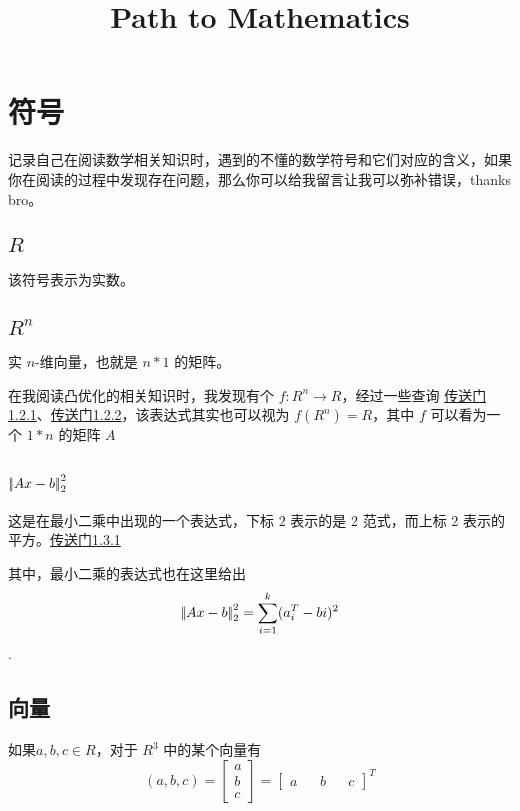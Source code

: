 \documentclass[article]{article}
\begin{document}
\title{Path to Mathematics}
\maketitle

\section{符号}
记录自己在阅读数学相关知识时，遇到的不懂的数学符号和它们对应的含义，如果你在阅读的过程中发现存在问题，那么你可以给我留言让我可以弥补错误，thanks bro。
\subsection{\texorpdfstring{$R$}{}}
该符号表示为实数。

\subsection{\texorpdfstring{$R^n$}{}}
实 $n$-维向量，也就是 $n*1$ 的矩阵。

在我阅读凸优化的相关知识时，我发现有个 $f: R^n \to R$，经过一些查询 \href{https://math.stackexchange.com/questions/1852420/what-does-mathbbrn-to-mathbbrm-mean-and-what-is-mathbbrn}{传送门1.2.1}、\href{https://math.ryerson.ca/~danziger/professor/MTH141/Handouts/vectors.pdf}{传送门1.2.2}，该表达式其实也可以视为 $f(R^n) = R$，其中 $f$ 可以看为一个 $1 * n$ 的矩阵 $A$

\subsection{\texorpdfstring{$\text{\textbardbl} Ax -b \text{\textbardbl}_2^2$}{}}
这是在最小二乘中出现的一个表达式，下标 $2$ 表示的是 2 范式，而上标 $2$ 表示的平方。\href{https://math.stackexchange.com/questions/3045899/if-a-has-orthonormal-columns-then-ax2-2-x2-2-why}{传送门1.3.1}

其中，最小二乘的表达式也在这里给出 $$\text{\textbardbl} Ax -b \text{\textbardbl}_2^2 = \displaystyle\sum_{i = 1}^k(a^T_i - bi)^2$$.

\subsection{向量}
如果$a,b,c \in R$，对于 $R^3$ 中的某个向量有 $$(a,b,c) = \begin{bmatrix} a\\ b\\ c \end{bmatrix} = \begin{bmatrix}
    a && b && c
\end{bmatrix}^T$$
\end{document}
